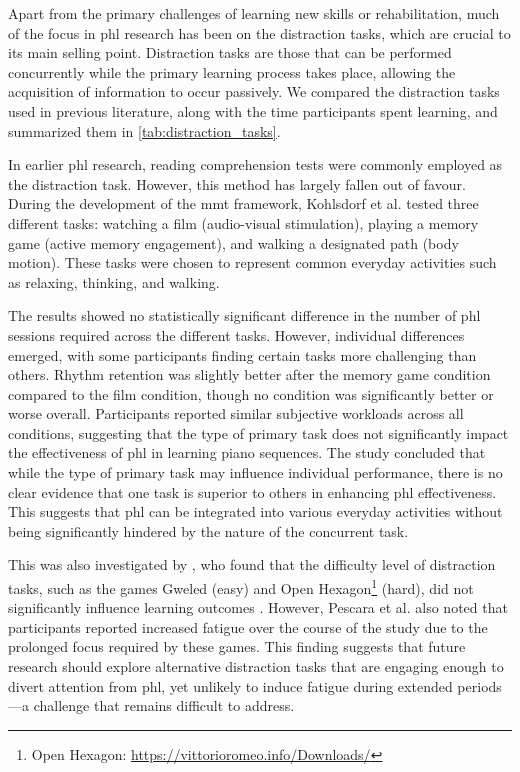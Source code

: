 Apart from the primary challenges of learning new skills or rehabilitation, much of the focus in \gls{phl} research has been on the distraction tasks, which are crucial to its main selling point. Distraction tasks are those that can be performed concurrently while the primary learning process takes place, allowing the acquisition of information to occur passively. We compared the distraction tasks used in previous literature, along with the time participants spent learning, and summarized them in \autoref{tab:distraction_tasks}.

In earlier \gls{phl} research, reading comprehension tests \cite{Huang2008, Huang2010, Kohlsdorf2010} were commonly employed as the distraction task. However, this method has largely fallen out of favour. During the development of the \gls{mmt} framework, Kohlsdorf et al. \cite{Kohlsdorf2010} tested three different tasks: watching a film (audio-visual stimulation), playing a memory game (active memory engagement), and walking a designated path (body motion). These tasks were chosen to represent common everyday activities such as relaxing, thinking, and walking.

The results showed no statistically significant difference in the number of \gls{phl} sessions required across the different tasks. However, individual differences emerged, with some participants finding certain tasks more challenging than others. Rhythm retention was slightly better after the memory game condition compared to the film condition, though no condition was significantly better or worse overall. Participants reported similar subjective workloads across all conditions, suggesting that the type of primary task does not significantly impact the effectiveness of \gls{phl} in learning piano sequences. The study concluded that while the type of primary task may influence individual performance, there is no clear evidence that one task is superior to others in enhancing \gls{phl} effectiveness. This suggests that \gls{phl} can be integrated into various everyday activities without being significantly hindered by the nature of the concurrent task.

This was also investigated by \citet{Pescara2019}, who found that the difficulty level of distraction tasks, such as the games Gweled (easy) and Open Hexagon\footnote{Open Hexagon: \url{https://vittorioromeo.info/Downloads/}} (hard), did not significantly influence learning outcomes \cite{Pescara2019}. However, Pescara et al. also noted that participants reported increased fatigue over the course of the study due to the prolonged focus required by these games. This finding suggests that future research should explore alternative distraction tasks that are engaging enough to divert attention from \gls{phl}, yet unlikely to induce fatigue during extended periods—a challenge that remains difficult to address.

